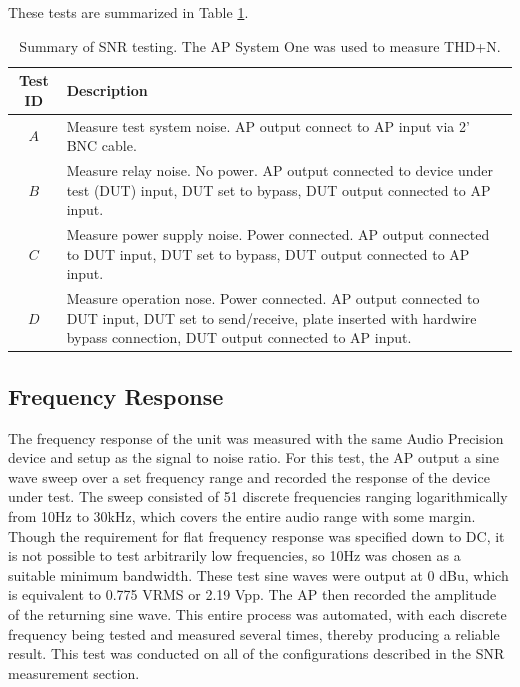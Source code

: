 \documentclass{article}
\begin{document}
	These tests are summarized in Table \ref{tab:SNRtests}.

	\begin{table}
	\begin{center}
	\begin{tabular}{ |c p{5in}| }
	\hline
	Test ID & Description \\ 
	\hline
	$A$ & Measure test system noise.  AP output connect to AP input via 2' BNC cable. \\
	$B$ & Measure relay noise.  No power.   AP output connected to device under test (DUT) input, DUT set to bypass, DUT output connected to AP input. \\
	$C$ & Measure power supply noise.  Power connected.  AP output connected to DUT input, DUT set to bypass, DUT output connected to AP input. \\
	$D$ & Measure operation nose.  Power connected.   AP output connected to DUT input, DUT set to send/receive, plate inserted with hardwire bypass connection, DUT output connected to AP input.\\
   	\hline
	\end{tabular}
	\caption{Summary of SNR testing.  The AP System One was used to measure THD+N.}
	\label{tab:SNRtests}
	\end{center}
	\end{table}



	\subsection{Frequency Response}
	The frequency response of the unit was measured with the same Audio Precision device and setup as the signal to noise ratio.  For this test, the AP output a sine wave sweep over a set frequency range and recorded the response of the device under test.  The sweep consisted of 51 discrete frequencies ranging logarithmically from 10Hz to 30kHz, which covers the entire audio range with some margin.  Though the requirement for flat frequency response was specified down to DC, it is not possible to test arbitrarily low frequencies, so 10Hz was chosen as a suitable minimum bandwidth.  These test sine waves were output at 0 dBu, which is equivalent to 0.775 VRMS or 2.19 Vpp.  The AP then recorded the amplitude of the returning sine wave.  This entire process was automated, with each discrete frequency being tested and measured several times, thereby producing a reliable result.  This test was conducted on all of the configurations described in the SNR measurement section.  
\end{document}

